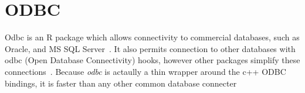 \section{ODBC}

Odbc is an R package which allows connectivity to commercial
databases, such as Oracle, and MS SQL
Server~\cite{hid-sp18-403-R-odbc}. It also permits connection to other
databases with odbc (Open Database Connectivity) hooks, however other
packages simplify these connections~\cite{hid-sp18-403-R-dbi}.
Because \textit{odbc} is actaully a thin wrapper around the c++ ODBC
bindings, it is faster than any other common database
connecter~\cite{rstudio-odbc}
